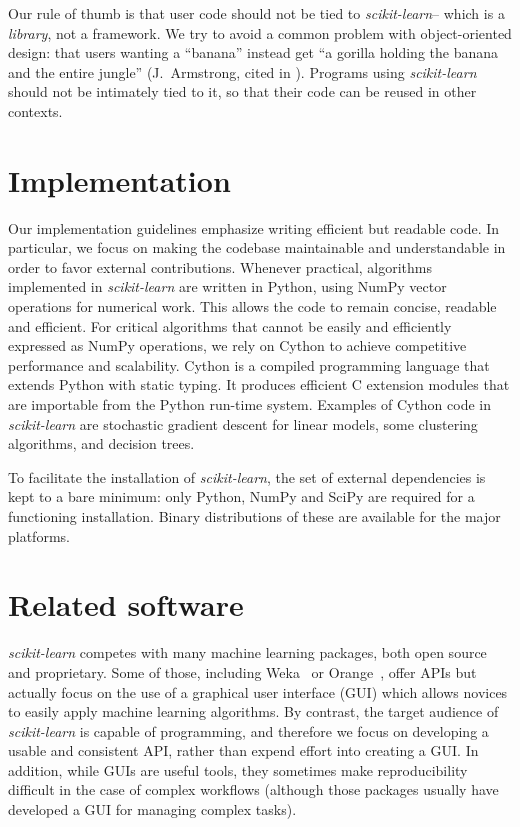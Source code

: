 \documentclass[twocolumn]{article}
\newcommand{\sklearn}{\textit{scikit-learn}\xspace}
\begin{document}
Our rule of thumb is that user code should not be tied to \sklearn -- which is a
\textit{library}, not a framework. We try to avoid a
common problem with object-oriented design: that users wanting a
``banana'' instead get ``a gorilla holding the banana and the entire jungle''
(J.~Armstrong, cited in \citep[p.~213]{seibel2009coders}).
Programs using \sklearn should not be intimately tied to it,
so that their code can be reused in other contexts.

\section{Implementation}
\label{sec:implementation}

Our implementation guidelines emphasize writing efficient but readable code.
In particular, we focus on making the codebase maintainable and
understandable in order to favor external contributions. Whenever practical,
algorithms implemented in \sklearn are written in Python,
using NumPy vector operations for numerical work.
This allows the code to remain concise, readable and efficient.
For critical algorithms that cannot be easily and efficiently
expressed as NumPy operations, we rely on Cython \citep{behnel2011cython}
to achieve competitive performance and scalability. Cython is a
compiled programming language that extends Python with static typing. It
produces efficient C extension modules that are importable from the
Python run-time system. Examples of Cython code in \sklearn are
stochastic gradient descent for linear models, some clustering
algorithms, and decision trees.

To facilitate the installation of \sklearn,
the set of external dependencies is kept to a bare minimum:
only Python, NumPy and SciPy are required for a functioning installation.
Binary distributions of these are available for the major platforms.

\section{Related software}
\label{sec:comparison}

\sklearn competes with many machine learning packages,
both open source and proprietary.
Some of those, including Weka~\citep{hall2009weka} or
Orange~\citep{Demsar2004}, offer APIs but actually focus on the use of a graphical user interface (GUI)
which allows novices to easily apply machine learning algorithms. By
contrast, the target audience of \sklearn is capable of programming, and
therefore we focus on developing a usable and consistent API, rather than expend
effort into creating a GUI\@. In addition, while GUIs are useful tools, they
sometimes make reproducibility difficult in the case of complex workflows
(although those packages usually have developed a GUI for managing complex
tasks).
\end{document}
